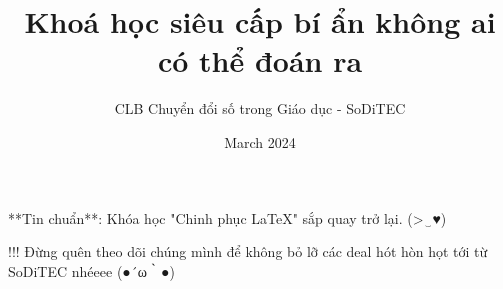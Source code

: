 \documentclass[fontsize=14]{extarticle}
\title{Khoá học siêu cấp bí ẩn không ai có thể đoán ra}
\author{CLB Chuyển đổi số trong Giáo dục - SoDiTEC}
\date{March 2024}
\begin{document}
\maketitle
**Tin chuẩn**: Khóa học "Chinh phục \LaTeX" sắp quay trở lại. (>‿♥) 

!!! Đừng quên theo dõi chúng mình để không bỏ lỡ các deal hót hòn họt tới từ SoDiTEC nhéeee (●´ω｀●) 
\end{document}

